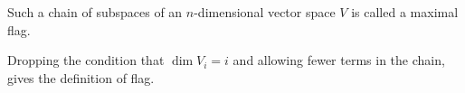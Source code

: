 Such a chain of subspaces of an $n$-dimensional vector space $V$ is called
a maximal flag.

Dropping the condition that $\dim V_i = i$ and allowing fewer terms in the
chain, gives the definition of flag.
